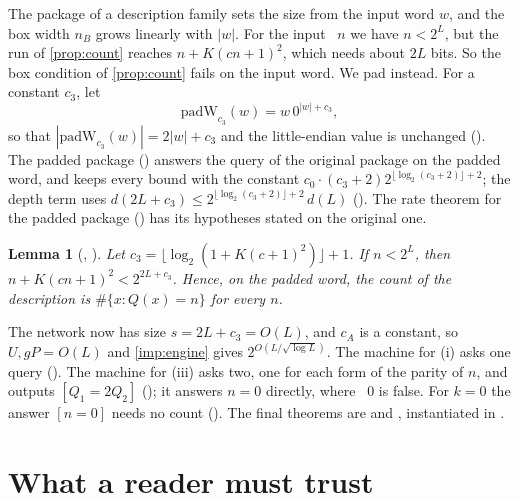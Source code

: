 \documentclass[10pt]{amsart}
\theoremstyle{plain}
\newtheorem{lemma}[theorem]{Lemma}
\theoremstyle{definition}
\theoremstyle{remark}
\numberwithin{equation}{section}
\begin{document}
The package of a description family sets the size from the input word $w$, and the box width $n_B$ grows
linearly with $|w|$. For the input ~$n$ we have $n<2^{L}$, but the run of
\cref{prop:count} reaches $n+K(cn+1)^2$, which needs about $2L$ bits. So the box condition of
\cref{prop:count} fails on the input word. We pad instead. For a constant $c_3$, let
\[
  \mathrm{padW}_{c_3}(w)=w\,0^{|w|+c_3},
\]
so that $|\mathrm{padW}_{c_3}(w)|=2|w|+c_3$ and the little-endian value is unchanged ().
The padded package () answers the query of the original package on the padded word,
and keeps every bound with the constant $c_0\cdot(c_3+2)2^{\lfloor\log_2(c_3+2)\rfloor+2}$; the depth term uses
$d(2L+c_3)\le2^{\lfloor\log_2(c_3+2)\rfloor+2}\,d(L)$ (). The rate theorem for the padded package
() has its hypotheses stated on the original one.

\begin{lemma}[, ]\label{lem:pad}
Let $c_3=\lfloor\log_2(1+K(c+1)^2)\rfloor+1$. If $n<2^L$, then $n+K(cn+1)^2<2^{2L+c_3}$. Hence, on the padded
word, the count of the description is $\#\{x:Q(x)=n\}$ for every $n$.
\end{lemma}

\noindent The network now has size $s=2L+c_3=O(L)$, and $c_A$ is a constant, so $U,gP=O(L)$ and
\cref{imp:engine} gives $2^{O(L/\sqrt{\log L})}$. The machine for (i) asks one query (). The
machine for (iii) asks two, one for each form of the parity of $n$, and outputs $[Q_1=2Q_2]$
(); it answers $n=0$ directly, where ~$0$ is false. For $k=0$ the answer
$[n=0]$ needs no count (). The final theorems are  and
, instantiated in .

\section{What a reader must trust}\label{sec:statement}
\end{document}
